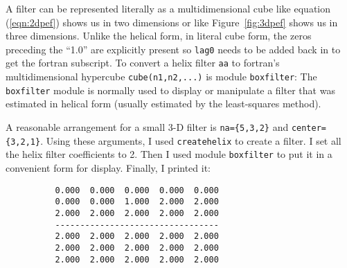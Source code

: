 \par
A filter can be represented literally as a multidimensional cube
like equation (\ref{eqn:2dpef}) shows us in two dimensions
or like Figure~\ref{fig:3dpef} shows us in three dimensions.
Unlike the helical form, in literal cube form,
the zeros preceding the ``1.0'' are explicitly present
so \texttt{lag0} needs to be added back in to get the fortran subscript.
To convert a helix filter \texttt{aa} to fortran's multidimensional hypercube
\texttt{cube(n1,n2,...)} is
module \texttt{boxfilter}: %
The \texttt{boxfilter} module is normally used
to display or manipulate a filter
that was estimated in helical form
(usually estimated by the least-squares method).

\begin{comment}
\par
The inverse process to \texttt{boxfilter} is to
convert a fortran hypercube to a helix filter.
For this we have module \texttt{unbox}. %
It abandons all zero-valued coefficients
such as those that should be zero before the box's 1.0.
It abandons the ``1.0'' as well, because it is implicitly present
in the helix convolution module \texttt{helicon} \vpageref{lst:helicon}.
\moddex{unbox}{Convert hypercube filter to helix}
An example of using \texttt{unbox} would be copying some numbers
such as the factored laplacian in equation (\ref{eqn:lapfac})
into a cube and then converting it to a helix.
\end{comment}

\par
A reasonable arrangement for a small 3-D filter is 
\texttt{na=\{5,3,2\}}
and
\texttt{center=\{3,2,1\}}.
Using these arguments, I used 
\texttt{createhelix} 
to create a filter.
I set all the helix filter coefficients to 2.
Then I used module \texttt{boxfilter} 
to put it in a convenient form for display.
Finally, I printed it:
\par\noindent
\footnotesize
\begin{verbatim}
          0.000  0.000  0.000  0.000  0.000
          0.000  0.000  1.000  2.000  2.000
          2.000  2.000  2.000  2.000  2.000
          ---------------------------------
          2.000  2.000  2.000  2.000  2.000
          2.000  2.000  2.000  2.000  2.000
          2.000  2.000  2.000  2.000  2.000
\end{verbatim}
\normalsize
\par\noindent

